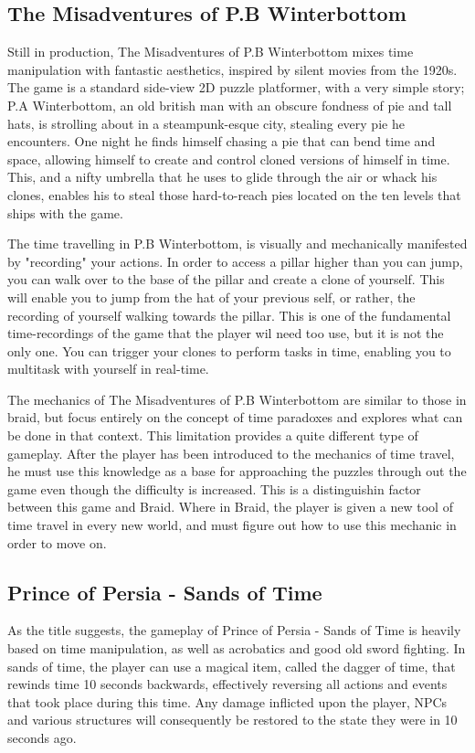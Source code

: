 \subsection{The Misadventures of P.B Winterbottom}

Still in production, The Misadventures of P.B Winterbottom mixes time manipulation with fantastic aesthetics, inspired by silent movies from the 1920s. 
The game is a standard side-view 2D puzzle platformer, with a very simple story; P.A Winterbottom, an old british man with an obscure fondness of pie and tall hats,
 is strolling about in a steampunk-esque city, stealing every pie he encounters. One night he finds himself chasing a pie that can bend time and space,
 allowing himself to create and control cloned versions of himself in time. This, and a nifty umbrella that he uses to glide through the air or whack his clones, 
enables his to steal those hard-to-reach pies located on the ten levels that ships with the game.

The time travelling in P.B Winterbottom, is visually and mechanically manifested by "recording" your actions. In order to access a pillar higher than you can jump, 
you can walk over to the base of the pillar and create a clone of yourself. This will enable you to jump from the hat of your previous self, or rather, the recording of 
yourself walking towards the pillar. This is one of the fundamental time-recordings of the game that the player wil need too use, but it is not the only one. You can trigger your clones to perform tasks in time, enabling you to multitask with yourself in real-time.

The mechanics of The Misadventures of P.B Winterbottom are similar to those in braid, but focus entirely on the concept of time paradoxes and explores what can be done in that context. This limitation provides a quite different type of gameplay. After the player has been introduced to the mechanics of time travel, he must use this knowledge as a base for approaching the puzzles through out the game even though the difficulty is increased. This is a distinguishin factor between this game and Braid. Where in Braid, the player is given a new tool of time travel in every new world, and must figure out how to use this mechanic in order to move on. 


\subsection{Prince of Persia - Sands of Time}
As the title suggests, the gameplay of Prince of Persia - Sands of Time is heavily based on time manipulation, as well as acrobatics and good old sword fighting. 
In sands of time, the player can use a magical item, called the dagger of time, that rewinds time 10 seconds backwards, effectively reversing all actions and events 
that took place during this time. Any damage inflicted upon the player, NPCs and various structures will consequently be restored to the state they were in 10 seconds ago.

